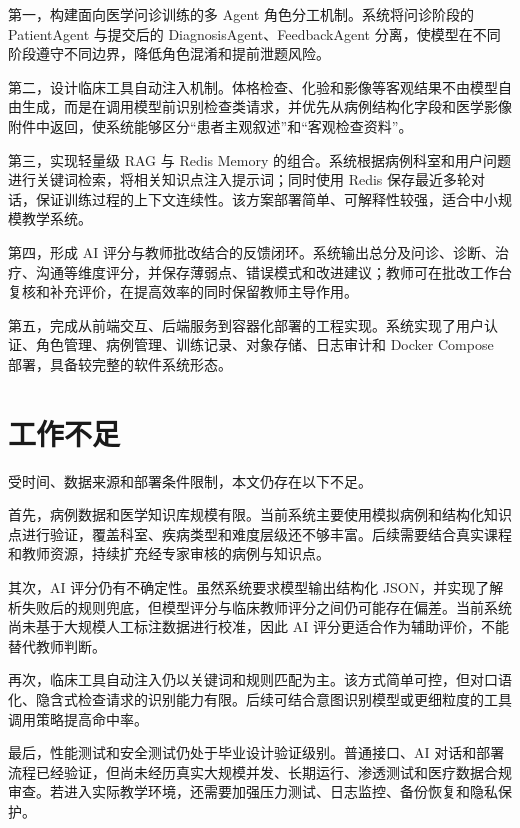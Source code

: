 第一，构建面向医学问诊训练的多 Agent 角色分工机制。系统将问诊阶段的 PatientAgent 与提交后的 DiagnosisAgent、FeedbackAgent 分离，使模型在不同阶段遵守不同边界，降低角色混淆和提前泄题风险。

第二，设计临床工具自动注入机制。体格检查、化验和影像等客观结果不由模型自由生成，而是在调用模型前识别检查类请求，并优先从病例结构化字段和医学影像附件中返回，使系统能够区分“患者主观叙述”和“客观检查资料”。

第三，实现轻量级 RAG 与 Redis Memory 的组合。系统根据病例科室和用户问题进行关键词检索，将相关知识点注入提示词；同时使用 Redis 保存最近多轮对话，保证训练过程的上下文连续性。该方案部署简单、可解释性较强，适合中小规模教学系统。

第四，形成 AI 评分与教师批改结合的反馈闭环。系统输出总分及问诊、诊断、治疗、沟通等维度评分，并保存薄弱点、错误模式和改进建议；教师可在批改工作台复核和补充评价，在提高效率的同时保留教师主导作用。

第五，完成从前端交互、后端服务到容器化部署的工程实现。系统实现了用户认证、角色管理、病例管理、训练记录、对象存储、日志审计和 Docker Compose 部署，具备较完整的软件系统形态。

\section{工作不足}

受时间、数据来源和部署条件限制，本文仍存在以下不足。

首先，病例数据和医学知识库规模有限。当前系统主要使用模拟病例和结构化知识点进行验证，覆盖科室、疾病类型和难度层级还不够丰富。后续需要结合真实课程和教师资源，持续扩充经专家审核的病例与知识点。

其次，AI 评分仍有不确定性。虽然系统要求模型输出结构化 JSON，并实现了解析失败后的规则兜底，但模型评分与临床教师评分之间仍可能存在偏差。当前系统尚未基于大规模人工标注数据进行校准，因此 AI 评分更适合作为辅助评价，不能替代教师判断。

再次，临床工具自动注入仍以关键词和规则匹配为主。该方式简单可控，但对口语化、隐含式检查请求的识别能力有限。后续可结合意图识别模型或更细粒度的工具调用策略提高命中率。

最后，性能测试和安全测试仍处于毕业设计验证级别。普通接口、AI 对话和部署流程已经验证，但尚未经历真实大规模并发、长期运行、渗透测试和医疗数据合规审查。若进入实际教学环境，还需要加强压力测试、日志监控、备份恢复和隐私保护。

